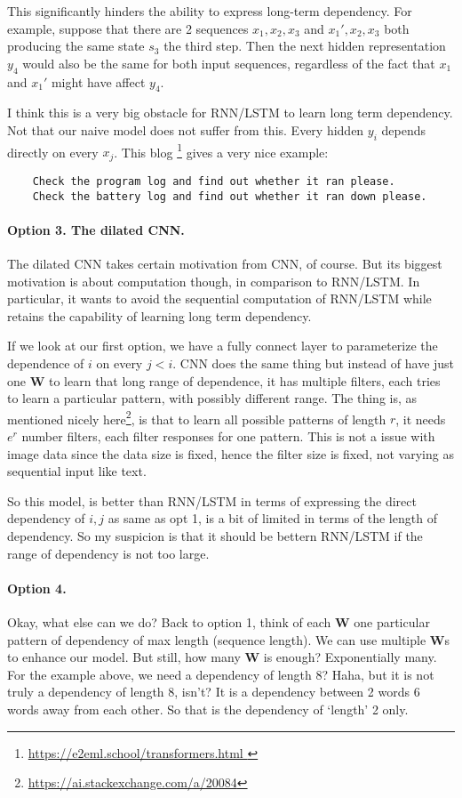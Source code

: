 \documentclass[11pt,a4paper]{article}
\begin{document}
This significantly hinders the ability to express long-term dependency. For example, suppose that there are 2 sequences $x_1, x_2, x_3$ and $x_1', x_2, x_3$ both producing the same state $s_3$ the third step. Then the next hidden representation $y_4$ would also be the same for both input sequences, regardless of the fact that $x_1$ and $x_1'$ might have affect $y_4$.

I think this is a very big obstacle for RNN/LSTM to learn long term dependency. Not that our naive model does not suffer from this. Every hidden $y_i$ depends directly on every $x_j$.
This blog \footnote{\url{ https://e2eml.school/transformers.html }} gives a very nice example:
\begin{verbatim}
    Check the program log and find out whether it ran please.
    Check the battery log and find out whether it ran down please.
\end{verbatim}

\paragraph{Option 3. The dilated CNN.} 
The dilated CNN takes certain motivation from CNN, of course. But its biggest motivation is about computation though, in comparison to RNN/LSTM. In particular, it wants to avoid the sequential computation of RNN/LSTM while retains the capability of learning long term dependency.

If we look at our first option, we have a fully connect layer to parameterize the dependence of $i$ on every $j<i$. CNN does the same thing but instead of have just one $\bm{W}$ to learn that long range of dependence, it has multiple filters, each tries to learn a particular pattern, with possibly different range.
The thing is, as mentioned nicely here\footnote{\url{https://ai.stackexchange.com/a/20084}}, is that to learn all possible patterns of length $r$, it needs $e^{r}$ number filters, each filter responses for one pattern.
This is not a issue with image data since the data size is fixed, hence the filter size is fixed, not varying as sequential input like text.

So this model, is better than RNN/LSTM in terms of expressing the direct dependency of $i, j$ as same as opt 1, is a bit of limited in terms of the length of dependency.
So my suspicion is that it should be bettern RNN/LSTM if the range of dependency is not too large.

\paragraph{Option 4.} 
Okay, what else can we do?
Back to option 1, think of each $\bm{W}$ one particular pattern of dependency of max length (sequence length). We can use multiple $\bm{W}$s to enhance our model. But still, how many $\bm{W}$ is enough? Exponentially many.
For the example above, we need a dependency of length $8$? Haha, but it is not truly a dependency of length 8, isn't? It is a dependency between 2 words 6 words away from each other. So that is the dependency of `length' 2 only.
\end{document}
